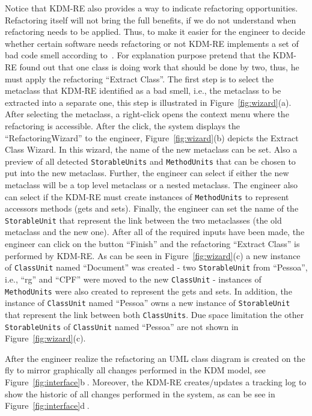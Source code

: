 Notice that KDM-RE also provides a way to indicate refactoring opportunities. Refactoring itself will not bring the full benefits, if we do not understand when refactoring needs to be applied. Thus, to make it easier for the engineer to decide whether certain software needs refactoring or 
not KDM-RE implements a set of bad code smell according to~\cite{bad_smeel2}. For explanation purpose pretend that the KDM-RE found out that one class is doing work that should be done by two, thus, he must apply the refactoring ``Extract Class''. The first step is to select the metaclass that KDM-RE identified as a bad smell, i.e., the metaclass to be extracted into a separate one, this step is illustrated in Figure~\ref{fig:wizard}(a). After selecting the metaclass, a right-click opens the context menu where the refactoring is accessible. After the click, the system displays the ``RefactoringWizard'' to the engineer, Figure~\ref{fig:wizard}(b) depicts the Extract Class Wizard. In this wizard, the name of the new metaclass can be set. Also a preview of all detected \texttt{StorableUnits} and \texttt{MethodUnits} that can be chosen to put into the new metaclass. Further, the engineer can select if either the new metaclass will be a top level metaclass or a nested metaclass. The engineer also can select if the KDM-RE must create instances of \texttt{MethodUnits} to represent accessors methods (gets and sets). Finally, the engineer can set the name of the \texttt{StorableUnit} that represent the link between the two metaclasses (the old metaclass and the new one). After all of the required inputs have been made, the engineer can click on the button ``Finish'' and the refactoring ``Extract Class'' is performed by KDM-RE. As can be seen in Figure~\ref{fig:wizard}(c) a new instance of \texttt{ClassUnit} named ``Document'' was created - two \texttt{StorableUnit} from ``Pessoa'', i.e., ``rg'' and ``CPF'' were moved to the new \texttt{ClassUnit} - instances of \texttt{MethodUnits} were also created to represent the gets and sets. In addition, the instance of \texttt{ClassUnit} named ``Pessoa'' owns a new instance of \texttt{StorableUnit} that represent the link between both \texttt{ClassUnits}. Due space limitation the other \texttt{StorableUnits} of \texttt{ClassUnit} named ``Pessoa'' are not shown in Figure~\ref{fig:wizard}(c).

After the engineer realize the refactoring an UML class diagram is created on the fly to mirror graphically all changes performed in the KDM model, see Figure~\ref{fig:interface}\textcircled{b}. Moreover, the KDM-RE creates/updates a tracking log to show the historic of all changes performed in the system, as can be see in Figure~\ref{fig:interface}\textcircled{d}. 

